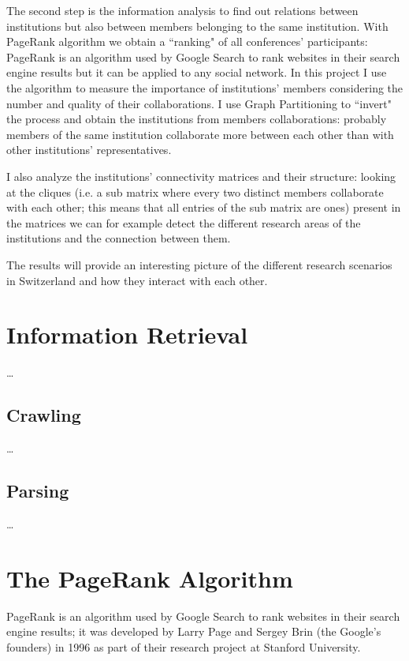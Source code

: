 \documentclass[]{usiinfbachelorproject}
\begin{document}
The second step is the information analysis to find out relations between institutions but also between members belonging to the same institution. With PageRank algorithm we obtain a ``ranking" of all conferences' participants: PageRank is an algorithm used by Google Search to rank websites in their search engine results but it can be applied to any social network. In this project I use the algorithm to measure the importance of institutions' members considering the number and quality of their collaborations. I use Graph Partitioning to ``invert" the process and obtain the institutions from members collaborations: probably members of the same institution collaborate more between each other than with other institutions' representatives.

I also analyze the institutions' connectivity matrices and their structure: looking at the cliques (i.e. a sub matrix where every two distinct members collaborate with each other; this means that all entries of the sub matrix are ones) present in the matrices we can for example detect the different research areas of the institutions and the connection between them.

The results will provide an interesting picture of the different research scenarios in Switzerland and how they interact with each other.






\section{Information Retrieval} \label{sec:inforetrieval} 

\ldots

\subsection{Crawling}

\ldots

\subsection{Parsing}

\ldots






\section{The PageRank Algorithm} \label{sec:pagerank} 
PageRank is an algorithm used by Google Search to rank websites in their search engine results; it was developed by  Larry Page and  Sergey Brin (the Google's founders) in 1996 as part of their research project at Stanford University.
\end{document}
